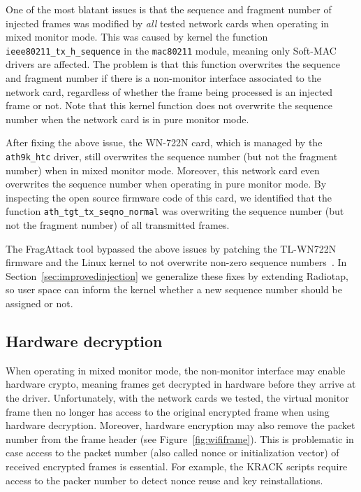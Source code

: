 \documentclass[sigconf]{acmart}
\newcommand{\red}[1]{\textcolor{red}{#1}}
\begin{document}
One of the most blatant issues is that the sequence and fragment number of injected frames was modified by \emph{all} tested network cards when operating in mixed monitor mode.
This was caused by kernel the function \verb|ieee80211_tx_h_sequence| in the \verb|mac80211| module, meaning only Soft-MAC drivers are affected.
The problem is that this function overwrites the sequence and fragment number if there is a non-monitor interface associated to the network card, regardless of whether the frame being processed is an injected frame or not.
Note that this kernel function does not overwrite the sequence number when the network card is in pure monitor mode.

After fixing the above issue, the WN-722N card, which is managed by the \verb|ath9k_htc| driver, still overwrites the sequence number (but not the fragment number) when in mixed monitor mode.
Moreover, this network card even overwrites the sequence number when operating in pure monitor mode.
By inspecting the open source firmware code of this card, we identified that the function \verb|ath_tgt_tx_seqno_normal| was overwriting the sequence number (but not the fragment number) of all transmitted frames.

The FragAttack tool bypassed the above issues by patching the TL-WN722N firmware and the Linux kernel to not overwrite non-zero sequence numbers~\cite{vanhoef-usenix2021-fragattacks}.
In Section~\ref{sec:improvedinjection} we generalize these fixes by extending Radiotap, so user space can inform the kernel whether a new sequence number should be assigned or not.

\subsection{Hardware decryption}
\label{sec:tests:hwcrypto}

When operating in mixed monitor mode,
the non-monitor interface may enable hardware crypto, meaning frames get decrypted in hardware before they arrive at the driver.
Unfortunately, with the network cards we tested, the virtual monitor frame then no longer has access to the original encrypted frame when using hardware decryption.
Moreover, hardware encryption may also remove the packet number from the frame header (see Figure~\ref{fig:wififrame}).
This is problematic in case access to the packet number (also called nonce or initialization vector) of received encrypted frames is essential.
For example, the KRACK scripts require access to the packer number to detect nonce reuse and key reinstallations.
\end{document}
